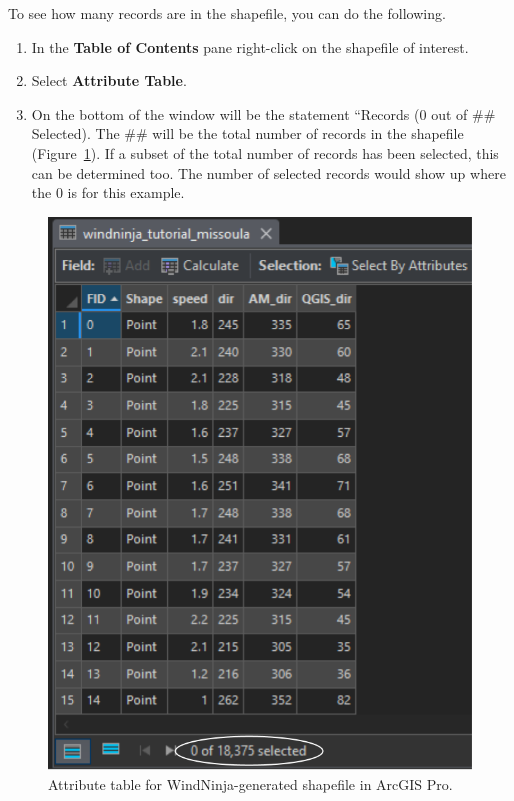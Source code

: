 \documentclass[12pt]{article}
\begin{document}
To see how many records are in the shapefile, you can do the following.
\begin{enumerate}

\item In the \textbf{Table of Contents} pane right-click on the shapefile of interest.
\item  Select \textbf{Attribute Table}.
\item On the bottom of the window will be the statement “Records (0 out of \#\# Selected). The \#\# will be the total number of records in the shapefile (Figure~\ref{fig:Figure20}). If a subset of the total number of records has been selected, this can be determined too. The number of selected records would show up where the 0 is for this example.
\end{enumerate}

\begin{figure}[H]
	\centering
	\includegraphics[scale=0.45]{arc_20.png}
	\caption{Attribute table for WindNinja-generated shapefile in ArcGIS Pro.}
\label{fig:Figure20}
\end{figure}
\end{document}
